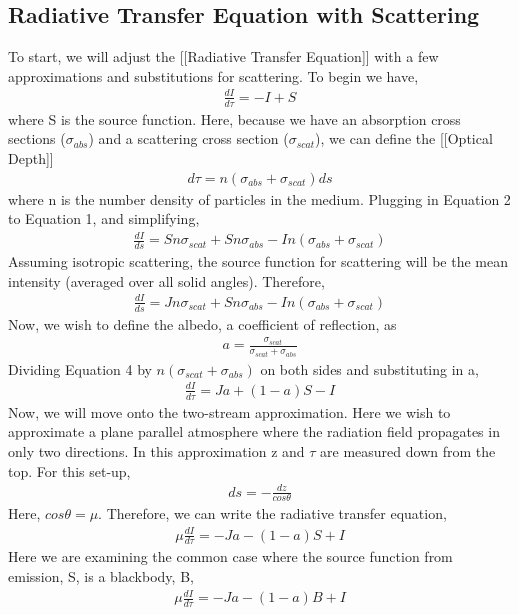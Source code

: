 \documentclass{article}
\begin{document}
 \subsection*{Radiative Transfer Equation with Scattering}
 To start, we will adjust the [[Radiative Transfer Equation]] with a few approximations and substitutions for scattering. To begin we have,
\begin{align}
\frac{dI}{d \tau} = -I + S
\end{align}
where S is the source function.
Here, because we have an absorption cross sections ($\sigma_{abs}$) and a scattering cross section ($\sigma_{scat}$), we can define the [[Optical Depth]]
\begin{align}
d\tau = n(\sigma_{abs} + \sigma_{scat}) ds
\end{align}
where n is the number density of particles  in the medium. 
Plugging in Equation 2 to Equation 1, and simplifying,
\begin{align}
\frac{dI}{ds} = Sn\sigma_{scat} + Sn \sigma_{abs} -In(\sigma_{abs} + \sigma_{scat})
\end{align}
Assuming isotropic scattering, the source function for scattering will be the mean intensity (averaged over all solid angles).
Therefore,
\begin{align}
\frac{dI}{ds} = Jn\sigma_{scat} + Sn \sigma_{abs} -In(\sigma_{abs} + \sigma_{scat})
\end{align}
Now, we wish to define the albedo, a coefficient of reflection, as
\begin{align}
a = \frac{\sigma_{scat}}{\sigma_{scat} + \sigma_{abs}}
\end{align}
Dividing Equation 4 by $n(\sigma_{scat} + \sigma_{abs})$ on both sides and substituting in a,
\begin{align}
\frac{dI}{d \tau} = Ja + (1-a)S - I
\end{align}
Now, we will move onto the two-stream approximation. Here we wish to approximate a plane parallel atmosphere where the radiation field propagates in only two directions. In this approximation z and $\tau$ are measured down from the top. For this set-up,
\begin{align}
ds = -\frac{dz}{cos \theta}
\end{align}
Here, $cos \theta = \mu$. Therefore, we can write the radiative transfer equation,
\begin{align}
\mu \frac{dI}{d\tau} = -Ja - (1-a)S + I
\end{align}
Here we are examining the common case where the source function from emission, S, is a blackbody, B,
\begin{align}
\mu \frac{dI}{d\tau} = -Ja - (1-a)B + I
\end{align}
\end{document}
